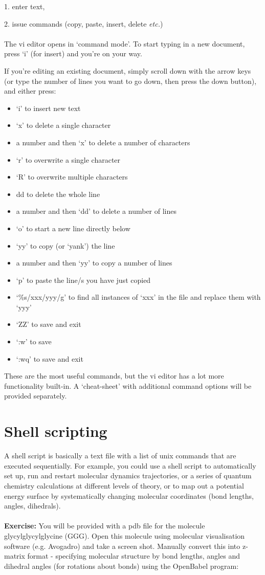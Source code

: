 \documentclass{article}
\begin{document}
1. enter text, 

2. issue commands (copy, paste, insert, delete \textit{etc.})\\
\\
\noindent
The vi editor opens in `command mode'. To start typing in a new document, press `i' (for insert) and you're on your way. 

\clearpage
\noindent
If you're editing an existing document, simply scroll down with the arrow keys (or type the number of lines you want to go down, then press the down button), and either press:
\begin{itemize}
\item{`i' to insert new text}
\item{`x' to delete a single character}
\item{a number and then `x' to delete a number of characters}
\item{`r' to overwrite a single character}
\item{`R' to overwrite multiple characters}
\item{dd to delete the whole line}
\item{a number and then `dd' to delete a number of lines}
\item{`o' to start a new line directly below}
\item{`yy' to copy (or `yank') the line}
\item{a number and then `yy' to copy a number of lines}
\item{`p' to paste the line/s you have just copied}
\item{`\%s/xxx/yyy/g' to find all instances of `xxx' in the file and replace them with `yyy'}
\item{`ZZ' to save and exit}
\item{`:w' to save}
\item{`:wq' to save and exit}
\end{itemize}
These are the most useful commands, but the vi editor has a lot more functionality built-in. A `cheat-sheet' with additional command options will be provided separately.

\clearpage

\section{Shell scripting}
A shell script is basically a text file with a list of unix commands that are executed sequentially. For example, you could use a shell script to automatically set up, run and restart molecular dynamics trajectories, or a series of quantum chemistry calculations at different levels of theory, or to map out a potential energy surface by systematically changing molecular coordinates (bond lengths, angles, dihedrals).\\
\\
\textbf{Exercise:} You will be provided with a pdb file for the molecule glycylglycylglycine (GGG). Open this molecule using molecular visualisation software (e.g. Avogadro) and take a screen shot. Manually convert this into z-matrix format - specifying molecular structure by bond lengths, angles and dihedral angles (for rotations about bonds) using the OpenBabel program:\\
\end{document}
